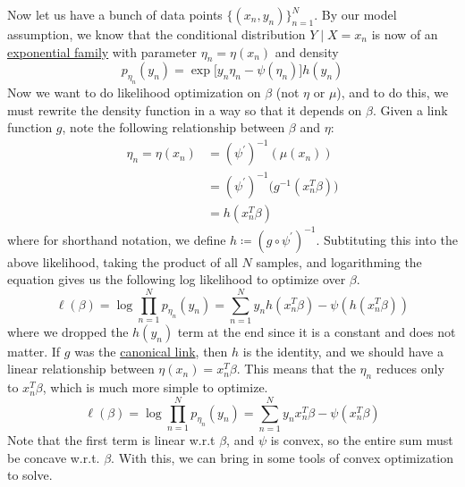   Now let us have a bunch of data points $\{(x_n, y_n)\}_{n=1}^N$. By our model assumption, we know that the conditional distribution $Y \mid X = x_n$ is now of an \hyperref[def:exponential-family]{exponential family} with parameter $\eta_n = \eta (x_n)$ and density 
  \begin{equation}
    p_{\eta_n} (y_n) = \exp \big[ y_n \eta_n - \psi(\eta_n) \big] h(y_n)
  \end{equation}
  Now we want to do likelihood optimization on $\beta$ (not $\eta$ or $\mu$), and to do this, we must rewrite the density function in a way so that it depends on $\beta$. Given a link function $g$, note the following relationship between $\beta$ and $\eta$: 
  \begin{align*}
      \eta_n = \eta (x_n) & = (\psi^\prime)^{-1} (\mu (x_n)) \\
      & = (\psi^{\prime})^{-1} \big( g^{-1} (x_n^T \beta )\big) \\
      & = h(x_n^T \beta) 
  \end{align*}
  where for shorthand notation, we define $h \coloneqq (g \circ \psi^\prime)^{-1}$. Subtituting this into the above likelihood, taking the product of all $N$ samples, and logarithming the equation gives us the following log likelihood to optimize over $\beta$. 
  \begin{equation}
    \ell(\beta) = \log \prod_{n=1}^N p_{\eta_n} (y_n) = \sum_{n=1}^N y_n h(x_n^T \beta)  - \psi(h(x_n^T \beta) )
  \end{equation}
  where we dropped the $h(y_n)$ term at the end since it is a constant and does not matter. If $g$ was the \hyperref[def:canonical-link]{canonical link}, then $h$ is the identity, and we should have a linear relationship between $\eta (x_n) = x_n^T \beta$. This means that the $\eta_n$ reduces only to $x_n^T \beta$, which is much more simple to optimize. 
  \begin{equation}
    \ell(\beta) = \log \prod_{n=1}^N p_{\eta_n} (y_n) = \sum_{n=1}^N y_n x_n^T \beta - \psi(x_n^T \beta)
  \end{equation}
  Note that the first term is linear w.r.t $\beta$, and $\psi$ is convex, so the entire sum must be concave w.r.t. $\beta$. With this, we can bring in some tools of convex optimization to solve. 

